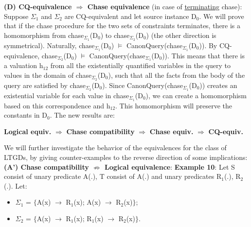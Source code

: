\documentclass[11pt, a4paper, dvipsnames]{article}
\begin{document}
\textbf{(D) CQ-equivalence $\Rightarrow$ Chase equivalence} (in case of \underline{terminating} chase):\newline
Suppose $\Sigma_{1}$ and $\Sigma_{2}$ are CQ-equivalent and let source instance D$_{0}$. We will prove that if the chase procedure for the two sets of constraints terminates, there is a homomorphism from chase$_{\Sigma_{1}}$(D$_{0}$) to chase$_{\Sigma_{2}}$(D$_{0}$) (the other direction is symmetrical). Naturally, chase$_{\Sigma_{1}}$(D$_{0}$) $\vDash$ CanonQuery(chase$_{\Sigma_{1}}$(D$_{0}$)). By CQ-equivalence, chase$_{\Sigma_{2}}$(D$_{0}$) $\vDash$ CanonQuery(chase$_{\Sigma_{1}}$(D$_{0}$)). This means that there is a valuation h$_{12}$ from all the existentially quantified variables in the query to values in the domain of chase$_{\Sigma_{2}}$(D$_{0}$), such that all the facts from the body of the query are satisfied by chase$_{\Sigma_{2}}$(D$_{0}$). Since CanonQuery(chase$_{\Sigma_{1}}$(D$_{0}$)) creates an existential variable for each value in chase$_{\Sigma_{1}}$(D$_{0}$), we can create a homomorphism based on this correspondence and h$_{12}$. This homomorphism will preserve the constants in D$_{0}$.\newline
The new results are:
\begin{center}
\textbf{Logical equiv.} $\Rightarrow$ \textbf{Chase compatibility} $\Rightarrow$ \textbf{Chase equiv.} $\Rightarrow$ \textbf{CQ-equiv.}
\end{center}
We will further investigate the behavior of the equivalences for the class of LTGDs, by giving counter-examples to the reverse direction of some implications:\newline
\textbf{(A') Chase compatibility $\nRightarrow$ Logical equivalence}:\newline
\textbf{Example 10}: Let S consist of unary predicate A(.), T consist of A(.) and unary predicates R$_{1}$(.), R$_{2}$(.). Let:
\begin{itemize}
	\item $\Sigma_{1}$ = $\{$A(x) $\rightarrow$ R$_{1}$(x); A(x) $\rightarrow$ R$_{2}$(x)$\}$;
	\item $\Sigma_{2}$ = $\{$A(x) $\rightarrow$ R$_{1}$(x); R$_{1}$(x) $\rightarrow$ R$_{2}$(x)$\}$.
\end{itemize}
\begin{center}
\end{center}
\end{document}

